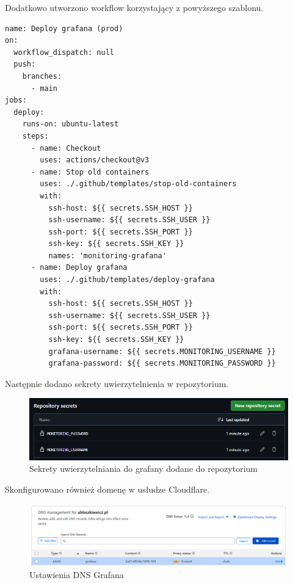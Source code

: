 \documentclass{article}
\begin{document}
Dodatkowo utworzono workflow korzystający z powyższego szablonu.

\begin{lstlisting}[caption=Plik \texttt{.github/workflows/prod-deploy-grafana.yml}]
name: Deploy grafana (prod)
on:
  workflow_dispatch: null
  push:
    branches:
      - main
jobs:
  deploy:
    runs-on: ubuntu-latest
    steps:
      - name: Checkout
        uses: actions/checkout@v3
      - name: Stop old containers
        uses: ./.github/templates/stop-old-containers
        with:
          ssh-host: ${{ secrets.SSH_HOST }}
          ssh-username: ${{ secrets.SSH_USER }}
          ssh-port: ${{ secrets.SSH_PORT }}
          ssh-key: ${{ secrets.SSH_KEY }}
          names: 'monitoring-grafana'
      - name: Deploy grafana
        uses: ./.github/templates/deploy-grafana
        with:
          ssh-host: ${{ secrets.SSH_HOST }}
          ssh-username: ${{ secrets.SSH_USER }}
          ssh-port: ${{ secrets.SSH_PORT }}
          ssh-key: ${{ secrets.SSH_KEY }}
          grafana-username: ${{ secrets.MONITORING_USERNAME }}
          grafana-password: ${{ secrets.MONITORING_PASSWORD }}
\end{lstlisting}

Następnie dodano sekrety uwierzytelnienia w repozytorium.

\begin{figure}[H]
    \centering
    \includegraphics[width=1\linewidth]{sekretyGrafana.png}
    \caption{Sekrety uwierzytelniania do grafany dodane do repozytorium}
    \label{fig:enter-label}
\end{figure}

Skonfigurowano również domenę w usłudze Cloudflare.

\begin{figure}[H]
    \centering
    \includegraphics[width=1\linewidth]{grafanaDNS.png}
    \caption{Ustawienia DNS Grafana}
    \label{fig:enter-label}
\end{figure}
\end{document}
